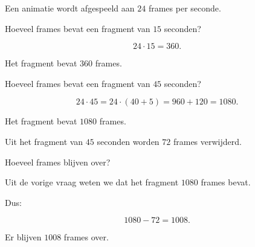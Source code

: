 \documentclass{ximera}
\begin{document}
\begin{oefening}{\oefU}

Een animatie wordt afgespeeld aan \(24\) frames per seconde.

\begin{question}

Hoeveel frames bevat een fragment van \(15\) seconden?

\begin{oplossing}

\[
24\cdot15=360.
\]

Het fragment bevat \(360\) frames.

\end{oplossing}

\end{question}


\begin{question}

Hoeveel frames bevat een fragment van \(45\) seconden?

\begin{oplossing}

\[
24\cdot45
=
24\cdot(40+5)
=
960+120
=
1080.
\]

Het fragment bevat \(1080\) frames.

\end{oplossing}

\end{question}


\begin{question}

Uit het fragment van \(45\) seconden worden \(72\) frames verwijderd.

Hoeveel frames blijven over?

\begin{oplossing}

Uit de vorige vraag weten we dat het fragment \(1080\) frames bevat.

Dus:

\[
1080-72=1008.
\]

Er blijven \(1008\) frames over.

\end{oplossing}

\end{question}

\end{oefening}


\end{document}
